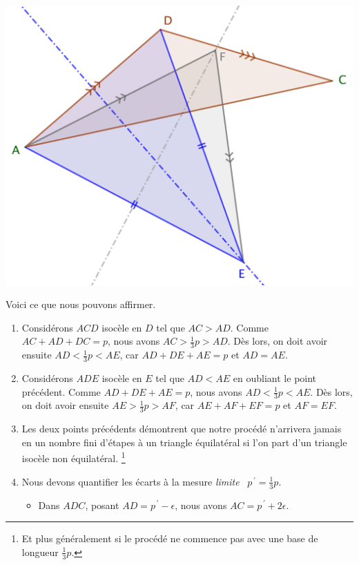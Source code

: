 \begin{remark}
	\begin{center}
		\includegraphics[scale=.4]{content/triangle-gene/triangle-proof.png}
	\end{center} 
	
	
	Voici ce que nous pouvons affirmer.
	\begin{enumerate}
		\item Considérons $ACD$ isocèle en $D$ tel que $AC > AD$.
		Comme $AC + AD + DC = p$, nous avons $AC > \frac13p > AD$.
		Dès lors, on doit avoir ensuite  $AD < \frac13p < AE$, car $AD + DE + AE = p$ et $AD = AE$.


		\item Considérons $ADE$ isocèle en $E$ tel que $AD < AE$ en oubliant le point précédent.
		Comme $AD + DE + AE = p$, nous avons $AD < \frac13p < AE$.
		Dès lors, on doit avoir ensuite  $AE > \frac13p > AF$, car $AE + AF + EF = p$ et $AF = EF$.


		\item Les deux points précédents démontrent que notre procédé n'arrivera jamais en un nombre fini d'étapes à un triangle équilatéral si l'on part d'un triangle isocèle non équilatéral.%
		\footnote{
			Et plus généralement si le procédé ne commence pas avec une base de longueur $\frac13 p$.
		}


		\item Nous devons quantifier les écarts à la mesure \og \emph{limite} \fg\ $p^{\,\prime} = \frac13 p$. 
		\begin{itemize}
			\item Dans $ADC$, posant $AD = p^{\,\prime} - \epsilon$, nous avons $AC = p^{\,\prime} + 2 \epsilon$.


\end{itemize}
\end{enumerate}
\end{remark}
